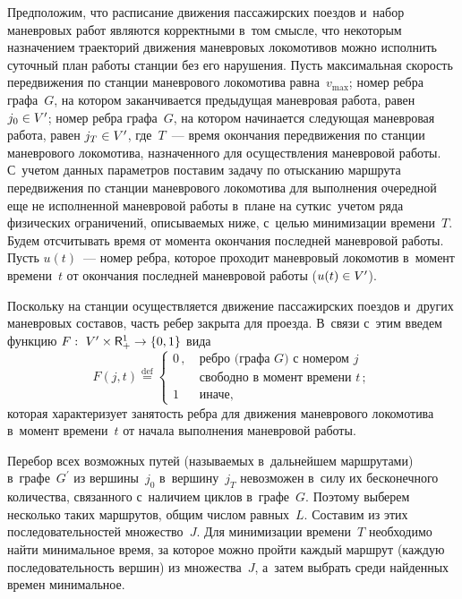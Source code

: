 \begin{multicols}{2}
      Предположим, что расписание движения пассажирских поездов и~набор 
маневровых работ являются корректными в~том смысле, что некоторым 
назначением траекторий движения маневровых локомотивов можно исполнить 
суточный план работы станции без его нарушения. Пусть максимальная скорость 
передвижения по станции маневрового локомотива равна~$v_{\max}$; номер 
ребра графа~$G$, на котором заканчивается предыдущая маневровая работа, равен 
$j_0\hm\in V^\prime$; номер ребра графа~$G$, на котором начинается следующая 
маневровая работа, равен $j_T\hm\in V^\prime$, где~$T$~--- время окончания 
передвижения по станции маневрового локомотива, назначенного для 
осуществления маневровой работы. С~учетом данных параметров поставим 
задачу по отысканию маршрута передвижения по станции маневрового 
локомотива для выполнения очередной еще не исполненной маневровой работы 
в~плане на сутки\linebreak с~учетом ряда физических ограничений, описыва\-емых ниже, 
с~целью минимизации времени~$T$. Будем отсчитывать время от момента 
окончания последней маневровой работы. Пусть $u(t)$~--- номер ребра, которое 
проходит маневровый локомотив в~момент времени~$t$ от окончания последней 
маневровой работы ($u(t)\hm\in V^\prime$).
      
      Поскольку на станции осуществляется движение пассажирских поездов 
и~других маневровых составов, часть ребер закрыта для проезда. В~связи с~этим 
введем функцию $F:\ V^\prime\times {\sf R}_+^1\hm\to \{0,1\}$ вида
 $$
 F(j,t) \stackrel{\mathrm{def}}{=}
 \begin{cases}
 0\,, &\ \mbox{ребро\ (графа\ $G$)\ с\ номером\ $j$}\\
 &\ \mbox{свободно\ в\ момент\ времени\  $t$}\,;\\
 1 &\ \mbox{иначе},
 \end{cases}
 $$
которая характеризует занятость ребра для движения маневрового локомотива 
в~момент времени~$t$ от начала выполнения маневровой работы.

      Перебор всех возможных путей (называемых в~дальнейшем маршрутами) 
в~графе~$G^\prime$ из вершины~$j_0$ в~вершину~$j_T$ невозможен в~силу их 
бесконечного количества, связанного с~наличием циклов в~графе~$G$. Поэтому 
выберем несколько таких маршрутов, общим числом равных~$L$. Составим из 
этих последовательностей множество~$J$. Для минимизации времени~$T$ 
необходимо найти минимальное время, за которое можно пройти каждый 
маршрут (каждую последовательность вершин) из множества~$J$, а~затем 
выбрать среди найденных времен минимальное.
      

\end{multicols}
